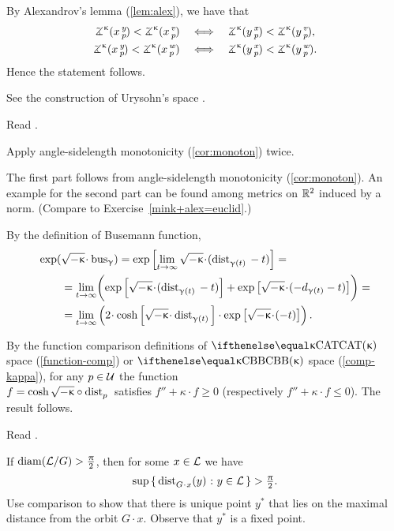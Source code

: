 By Alexandrov's lemma (\ref{lem:alex}), we have that 
\begin{align*}
\angk\kappa xyp<\angk\kappa xvp
\quad&\Longleftrightarrow\quad
\angk\kappa yxp<\angk\kappa yvp,
\\
\angk\kappa xyp<\angk\kappa xwp
\quad&\Longleftrightarrow\quad
\angk\kappa yxp<\angk\kappa ywp.
\end{align*}
Hence the statement follows.


 See the construction of Urysohn's space \cite[3.11$\tfrac{3}{2}_+$]{gromov-MS}.

Read \cite{lebedeva-petrunin}.

 Apply angle-sidelength  monotonicity (\ref{cor:monoton}) twice. 

 The first part follows from angle-sidelength  monotonicity (\ref{cor:monoton}).
An example for the second part can be found among metrics on $\mathbb{R}^2$ induced by a norm. (Compare to Exercise~\ref{mink+alex=euclid}.)

By the definition of Busemann function,
\begin{align*}
\exp(&\sqrt{-\kappa}\cdot\bus_\gamma) 
= \exp \left[\lim_{t\to \infty} \sqrt{-\kappa}\cdot(\distfun{{\gamma (t)}}{}{} - t)\right]=
\\
&= \lim_{t\to \infty} \biggl(\exp \left[\sqrt{-\kappa}\cdot(\distfun{\gamma (t)}{}{} -t)\right]
+\exp\left[\sqrt{-\kappa}\cdot(-d_{\gamma (t)}-t)\right]\biggr)=
\\
&=  \lim_{t\to \infty} \left(2\cdot \cosh \left[\sqrt{-\kappa}\cdot\distfun{\gamma (t)}{}{}\right]\cdot \exp\left[\sqrt{-\kappa}\cdot(-t)\right]\right).
\end{align*}

By the function comparison definitions of $\CAT\kappa$ space (\ref{function-comp}) or $\Alex{\kappa}$ space (\ref{comp-kappa}),  for any $p\in \spc{U}$ the function\\ $f=\cosh \sqrt{-\kappa}\circ\distfun{p}{}{}$ satisfies $f''+\kappa \cdot f\ge 0$ (respectively  $f''+\kappa \cdot f\le 0$). The result follows.

 Read \cite{petrunin:globalization}.

 If $\mathop{\rm diam}\nolimits(\mathcal{L}/G)>\tfrac{\uppi}2$, then for some $x\in \spc{L}$ we have
\[\sup \set{\distfun{G\cdot x}(y)}{y\in \spc{L}}
>
\tfrac\pi2.\]
Use comparison to show that there is unique point $y^{*}$ that lies on the maximal distance from the orbit $G\cdot x$.
Observe that $y^{*}$ is a fixed point.

